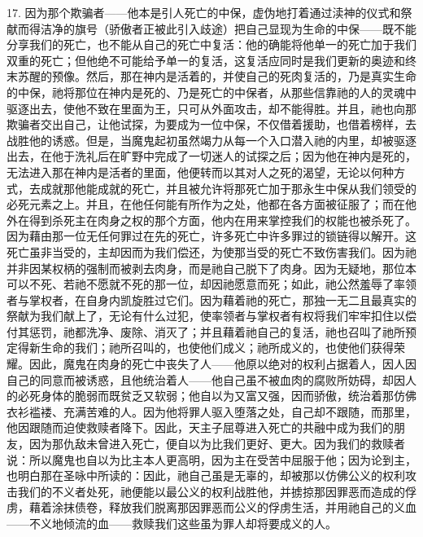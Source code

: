 17. 因为那个欺骗者——他本是引人死亡的中保，虚伪地打着通过渎神的仪式和祭献而得洁净的旗号（骄傲者正被此引入歧途）把自己显现为生命的中保——既不能分享我们的死亡，也不能从自己的死亡中复活：他的确能将他单一的死亡加于我们双重的死亡；但他绝不可能给予单一的复活，这复活应同时是我们更新的奥迹和终末苏醒的预像。然后，那在神内是活着的，并使自己的死肉复活的，乃是真实生命的中保，祂将那位在神内是死的、乃是死亡的中保者，从那些信靠祂的人的灵魂中驱逐出去，使他不致在里面为王，只可从外面攻击，却不能得胜。并且，祂也向那欺骗者交出自己，让他试探，为要成为一位中保，不仅借着援助，也借着榜样，去战胜他的诱惑。但是，当魔鬼起初虽然竭力从每一个入口潜入祂的内里，却被驱逐出去，在他于洗礼后在旷野中完成了一切迷人的试探之后；因为他在神内是死的，无法进入那在神内是活者的里面，他便转而以其对人之死的渴望，无论以何种方式，去成就那他能成就的死亡，并且被允许将那死亡加于那永生中保从我们领受的必死元素之上。并且，在他任何能有所作为之处，他都在各方面被征服了；而在他外在得到杀死主在肉身之权的那个方面，他内在用来掌控我们的权能也被杀死了。因为藉由那一位无任何罪过在先的死亡，许多死亡中许多罪过的锁链得以解开。这死亡虽非当受的，主却因而为我们偿还，为使那当受的死亡不致伤害我们。因为祂并非因某权柄的强制而被剥去肉身，而是祂自己脱下了肉身。因为无疑地，那位本可以不死、若祂不愿就不死的那一位，却因祂愿意而死；如此，祂公然羞辱了率领者与掌权者，在自身内凯旋胜过它们。因为藉着祂的死亡，那独一无二且最真实的祭献为我们献上了，无论有什么过犯，使率领者与掌权者有权将我们牢牢扣住以偿付其惩罚，祂都洗净、废除、消灭了；并且藉着祂自己的复活，祂也召叫了祂所预定得新生命的我们；祂所召叫的，也使他们成义；祂所成义的，也使他们获得荣耀。因此，魔鬼在肉身的死亡中丧失了人——他原以绝对的权利占据着人，因人因自己的同意而被诱惑，且他统治着人——他自己虽不被血肉的腐败所妨碍，却因人的必死身体的脆弱而既贫乏又软弱；他自以为又富又强，因而骄傲，统治着那仿佛衣衫褴褛、充满苦难的人。因为他将罪人驱入堕落之处，自己却不跟随，而那里，他因跟随而迫使救赎者降下。因此，天主子屈尊进入死亡的共融中成为我们的朋友，因为那仇敌未曾进入死亡，便自以为比我们更好、更大。因为我们的救赎者说：所以魔鬼也自以为比主本人更高明，因为主在受苦中屈服于他；因为论到主，也明白那在圣咏中所读的：因此，祂自己虽是无辜的，却被那以仿佛公义的权利攻击我们的不义者处死，祂便能以最公义的权利战胜他，并掳掠那因罪恶而造成的俘虏，藉着涂抹债卷，释放我们脱离那因罪恶而公义的俘虏生活，并用祂自己的义血——不义地倾流的血——救赎我们这些虽为罪人却将要成义的人。\par

